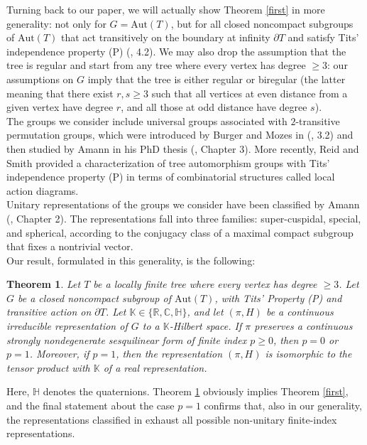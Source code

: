 \documentclass{article}
\theoremstyle{definition}
\theoremstyle{remark}
\theoremstyle{plain}
\newtheorem{thm}[dfn]{Theorem}
\begin{document}
Turning back to our paper, we will actually show Theorem \ref{first} in more generality: not only for $G=\mathrm{Aut}(T)$, but for all closed noncompact subgroups of $\mathrm{Aut}(T)$ that act transitively on the boundary at infinity $\partial T$ and satisfy Tits' independence property (P) (\cite{tits}, 4.2). We may also drop the assumption that the tree is regular and start from any tree where every vertex has degree $\geq 3$: our assumptions on $G$ imply that the tree is either regular or biregular (the latter meaning that there exist $r,s\geq 3$ such that all vertices at even distance from a given vertex have degree $r$, and all those at odd distance have degree $s$). \\

The groups we consider include universal groups associated with $2$-transitive permutation groups, which were introduced by Burger and Mozes in (\cite{burgermozes}, 3.2) and then studied by Amann in his PhD thesis (\cite{amann}, Chapter 3). More recently, Reid and Smith \cite{reidsmith} provided a characterization of tree automorphism groups with Tits' independence property (P) in terms of combinatorial structures called local action diagrams. \\

Unitary representations of the groups we consider have been classified by Amann (\cite{amann}, Chapter 2). The representations fall into three families: super-cuspidal, special, and spherical, according to the conjugacy class of a maximal compact subgroup that fixes a nontrivial vector. \\

Our result, formulated in this generality, is the following:

\begin{thm} \label{Main}
Let $T$ be a locally finite tree where every vertex has degree $\geq 3$. Let $G$ be a closed noncompact subgroup of $\mathrm{Aut}(T)$, with Tits' Property (P) and transitive action on $\partial T$. Let $\mathbb{K}\in\{\mathbb{R},\mathbb{C},\mathbb{H}\}$, and let $(\pi,H)$ be a continuous irreducible representation of $G$ to a $\mathbb{K}$-Hilbert space. If $\pi$ preserves a continuous strongly nondegenerate sesquilinear form of finite index $p\geq 0$, then $p=0$ or $p=1$. Moreover, if $p=1$, then the representation $(\pi,H)$ is isomorphic to the tensor product with $\mathbb{K}$ of a real representation.
\end{thm}

Here, $\mathbb{H}$ denotes the quaternions. Theorem \ref{Main} obviously implies Theorem \ref{first}, and the final statement about the case $p=1$ confirms that, also in our generality, the representations classified in \cite{bim} exhaust all possible non-unitary finite-index representations. \\
\end{document}
